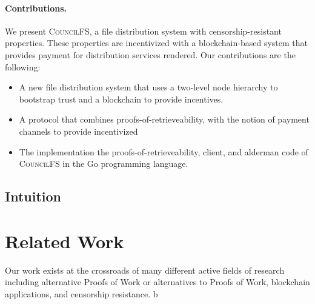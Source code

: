\documentclass{article}
\begin{document}
\paragraph{Contributions.} We present \textsc{CouncilFS}, a file distribution
system with censorship-resistant properties. These properties are incentivized
with a blockchain-based system that provides payment for distribution services
rendered. Our contributions are the following:
\begin{itemize}
\item A new file distribution system that uses a two-level node hierarchy to
  bootstrap trust and a blockchain to provide incentives.
\item A protocol that combines proofs-of-retrieveability, with the
  notion of payment channels to provide incentivized 
\item The implementation the proofs-of-retrieveability, client, and alderman
  code of \textsc{CouncilFS} in the Go programming language.
\end{itemize}

\subsection{Intuition}


\section{Related Work}
Our work exists at the crossroads of many different active fields of research including alternative Proofs of Work or alternatives to Proofs of Work, blockchain applications, and censorship resistance.
b
\end{document}

